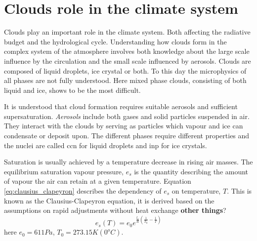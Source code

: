 \section{Clouds role in the climate system} \label{sec:cloud_in_climate_system}
Clouds play an important role in the climate system. Both affecting the radiative budget and the hydrological cycle. Understanding how clouds form in the complex system of the atmosphere involves both knowledge about the large scale influence by the circulation and the small scale influenced by aerosols. Clouds are composed of liquid droplets, ice crystal or both. To this day the microphysics of all phases are not fully understood. Here mixed phase clouds, consisting of both liquid and ice, shows to be the most difficult. 

It is understood that cloud formation requires suitable aerosols and sufficient supersaturation. \textit{Aerosols} include both gases and solid particles suspended in air. They interact with the clouds by serving as particles which vapour and ice can condensate or deposit upon. The different phases require different properties and the nuclei are called \acrfull{ccn} for liquid droplets and \acrfull{inp} for ice crystals. 

Saturation is usually achieved by a temperature decrease in rising air masses. The equilibrium saturation vapour pressure, $e_s$ is the quantity describing the amount of vapour the air can retain at a given temperature. Equation \eqref{eq:clausius_clapeyron} describes the dependency of $e_s$ on temperature, $T$. This is known as the Clausius-Clapeyron equation, it is derived based on the assumptions on rapid adjustments without heat exchange \textbf{other things}?
\begin{equation} \label{eq:clausius_clapeyron}
    e_s\left( T \right) = e_0 e^{\frac{l_v}{R} \left( \frac{1}{T_0} - \frac{1}{T} \right) }
\end{equation}
here $e_0 = 611Pa$, $T_0 = 273.15K \left(0 ^oC \right)$.

